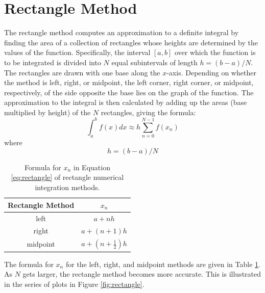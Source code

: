 \label{Numerical_Integration}

\section{Rectangle Method}
The rectangle method computes an approximation to a 
definite integral by finding the area of a collection of rectangles whose heights are determined 
by the values of the function.  Specifically, the interval $[a,b]$ over which the function is to 
be integrated is divided into $N$ equal subintervals of length $h = (b-a)/N$. The rectangles are 
drawn with one base along the $x$-axis. Depending on whether the method is left, right, or midpoint,
the left corner, right corner, or midpoint, respectively, of the side opposite the base lies on the 
graph of the function. The approximation to the integral is 
then calculated by adding up the areas (base multiplied by height) of the $N$ rectangles, giving the formula:
\begin{equation}
\int_a^b f(x) dx \approx h \sum_{n=0}^{N-1} f(x_n) \label{eq:rectangle}
\end{equation}
where
\begin{equation}
h=(b-a)/N 
\end{equation}

\begin{table}
\centering
\caption{Formula for $x_n$ in Equation \ref{eq:rectangle} of rectangle numerical integration methods.}
\label{tab:xn-rectangle}
\begin{tabular}{cc}\\
Rectangle Method & $x_n$ \\ \toprule
left & $a+nh$ \\ \midrule
right & $a+(n+1)h$ \\ \midrule
midpoint & $a+\left(n + \frac{1}{2}\right)h$ \\ \bottomrule
\end{tabular}
\end{table}

The formula for $x_n$ for the left, right, and midpoint methods are given in Table \ref{tab:xn-rectangle}.
As $N$ gets larger, the rectangle method becomes more accurate. This is illustrated in the series of plots
in Figure \ref{fig:rectangle}.

